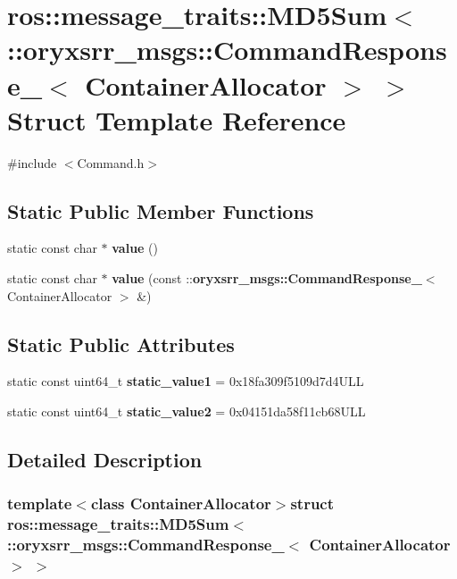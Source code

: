 \section{ros\-:\-:message\-\_\-traits\-:\-:\-M\-D5\-Sum$<$ \-:\-:oryxsrr\-\_\-msgs\-:\-:\-Command\-Response\-\_\-$<$ \-Container\-Allocator $>$ $>$ \-Struct \-Template \-Reference}
\label{structros_1_1message__traits_1_1MD5Sum_3_01_1_1oryxsrr__msgs_1_1CommandResponse___3_01ContainerAllocator_01_4_01_4}


{\ttfamily \#include $<$\-Command.\-h$>$}

\subsection*{\-Static \-Public \-Member \-Functions}
\begin{DoxyCompactItemize}
\item 
static const char $\ast$ {\bf value} ()
\item 
static const char $\ast$ {\bf value} (const \-::{\bf oryxsrr\-\_\-msgs\-::\-Command\-Response\-\_\-}$<$ \-Container\-Allocator $>$ \&)
\end{DoxyCompactItemize}
\subsection*{\-Static \-Public \-Attributes}
\begin{DoxyCompactItemize}
\item 
static const uint64\-\_\-t {\bf static\-\_\-value1} = 0x18fa309f5109d7d4\-U\-L\-L
\item 
static const uint64\-\_\-t {\bf static\-\_\-value2} = 0x04151da58f11cb68\-U\-L\-L
\end{DoxyCompactItemize}


\subsection{\-Detailed \-Description}
\subsubsection*{template$<$class Container\-Allocator$>$struct ros\-::message\-\_\-traits\-::\-M\-D5\-Sum$<$ \-::oryxsrr\-\_\-msgs\-::\-Command\-Response\-\_\-$<$ Container\-Allocator $>$ $>$}



